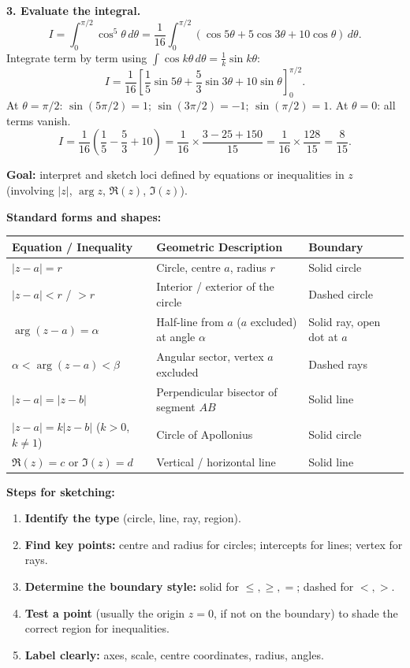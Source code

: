 \documentclass[11pt]{article}
\begin{document}
\begin{exoresolu}
\textbf{3. Evaluate the integral.}
\[
I = \int_0^{\pi/2} \cos^5\theta\, d\theta = \frac{1}{16} \int_0^{\pi/2} (\cos 5\theta + 5\cos 3\theta + 10\cos\theta)\, d\theta.
\]
Integrate term by term using $\displaystyle\int \cos k\theta\, d\theta = \frac{1}{k}\sin k\theta$:
\[
I = \frac{1}{16} \left[ \frac{1}{5}\sin 5\theta + \frac{5}{3}\sin 3\theta + 10\sin\theta \right]_0^{\pi/2}.
\]
At $\theta = \pi/2$: $\sin(5\pi/2) = 1$; $\sin(3\pi/2) = -1$; $\sin(\pi/2) = 1$. At $\theta=0$: all terms vanish.
\[
I = \frac{1}{16} \left( \frac{1}{5} - \frac{5}{3} + 10 \right) = \frac{1}{16}\times\frac{3 - 25 + 150}{15} = \frac{1}{16} \times \frac{128}{15} = \boxed{\frac{8}{15}}.
\]
\end{exoresolu}

\begin{methode}
\textbf{Goal:} interpret and sketch loci defined by equations or inequalities in $z$ (involving $|z|$, $\arg z$, $\Re(z)$, $\Im(z)$).

\textbf{Standard forms and shapes:}
\begin{center}
\begin{tabularx}{\linewidth}{|l|X|l|}\hline
\rowcolor{popblueL}
\textbf{Equation / Inequality} & \textbf{Geometric Description} & \textbf{Boundary} \\ \hline
$|z - a| = r$ & Circle, centre $a$, radius $r$ & Solid circle \\ \hline
$|z - a| < r$ / $> r$ & Interior / exterior of the circle & Dashed circle \\ \hline
$\arg(z - a) = \alpha$ & Half-line from $a$ ($a$ excluded) at angle $\alpha$ & Solid ray, open dot at $a$ \\ \hline
$\alpha < \arg(z - a) < \beta$ & Angular sector, vertex $a$ excluded & Dashed rays \\ \hline
$|z - a| = |z - b|$ & Perpendicular bisector of segment $AB$ & Solid line \\ \hline
$|z - a| = k|z - b|$ ($k>0$, $k\ne 1$) & Circle of Apollonius & Solid circle \\ \hline
$\Re(z)=c$ or $\Im(z)=d$ & Vertical / horizontal line & Solid line \\ \hline
\end{tabularx}
\end{center}

\textbf{Steps for sketching:}
\begin{enumerate}
    \item \textbf{Identify the type} (circle, line, ray, region).
    \item \textbf{Find key points:} centre and radius for circles; intercepts for lines; vertex for rays.
    \item \textbf{Determine the boundary style:} solid for $\le, \ge, =$; dashed for $<, >$.
    \item \textbf{Test a point} (usually the origin $z=0$, if not on the boundary) to shade the correct region for inequalities.
    \item \textbf{Label clearly:} axes, scale, centre coordinates, radius, angles.
\end{enumerate}


\end{methode}
\end{document}

